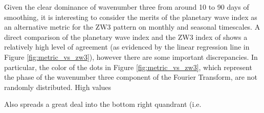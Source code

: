 Given the clear dominance of wavenumber three from around 10 to 90 days of smoothing, it is interesting to consider the merits of the planetary wave index as an alternative metric for the ZW3 pattern on monthly and seasonal timescales. A direct comparison of the planetary wave index and the ZW3 index of \citet{Raphael2004} shows a relatively high level of agreement (as evidenced by the linear regression line in Figure \ref{fig:metric_vs_zw3}), however there are some important discrepancies. In particular, the color of the dots in Figure \ref{fig:metric_vs_zw3}, which represent the phase of the wavenumber three component of the Fourier Transform, are not randomly distributed. High values  

Also spreads a great deal into the bottom right quandrant (i.e.  


